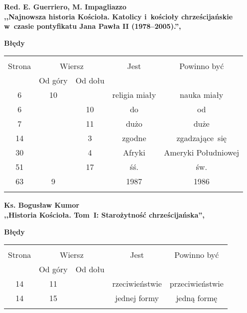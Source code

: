 \documentclass[a4paper,11pt]{article}
\newcommand{\spaceOne}{2em}
\newcommand{\tb}{\textbf}
\newcommand{\noi}{\noindent}
\newcommand{\start}{\noi \tb{--} {}}
\newcommand{\Center}[1]{\begin{center} #1 \end{center}}
\newcommand{\CenterTB}[1]{\Center{\tb{#1}}}
\newcommand{\StrWd}[2]{\tb{Str. #1, wiersz #2 (od dołu).}}
\newcommand{\Work}[1]{ \begin{center} {\large \tb{#1}} \end{center} }
\begin{document}
\Work{
  Red. E. Guerriero, M. Impagliazzo \\
  ,,Najnowsza historia Kościoła. Katolicy i~kościoły chrześcijańskie
  w~czasie pontyfikatu Jana Pawła II (1978--2005).'', \cite{GI06} }




\CenterTB{Błędy}
\begin{center}
  \begin{tabular}{|c|c|c|c|c|}
    \hline
    & \multicolumn{2}{c|}{} & & \\
    Strona & \multicolumn{2}{c|}{Wiersz}& Jest & Powinno być \\ \cline{2-3}
    & Od góry & Od dołu &  &  \\ \hline
    6 & 10 & & religia miały & nauka miały \\
    6 & & 10 & do & od \\
    7 & & 11 & dużo & duże \\
    14 & & 3 & zgodne & zgadzające~się \\
    30 & & 4 & Afryki & Ameryki Południowej \\
    51 & & 17 & śś. & św. \\
    63 & 9 & & 1987 & 1986 \\
    & & & & \\ \hline
  \end{tabular}
\end{center}

\vspace{\spaceOne}



\Work{
  Ks. Bogusław Kumor \\
  ,,Historia Kościoła. Tom~I: Starożytność chrześcijańska'',
  \cite{Kum03} }


\CenterTB{Błędy}
\begin{center}
  \begin{tabular}{|c|c|c|c|c|}
    \hline
    & \multicolumn{2}{c|}{} & & \\
    Strona & \multicolumn{2}{c|}{Wiersz}& Jest & Powinno być \\ \cline{2-3}
    & Od góry & Od dołu &  &  \\ \hline
    14 & 11 & & rzeciwieństwie & przeciwieństwie \\
    14 & 15 & & jednej formy & jedną formę \\
    & & & & \\ \hline
  \end{tabular}
\end{center}
\end{document}
